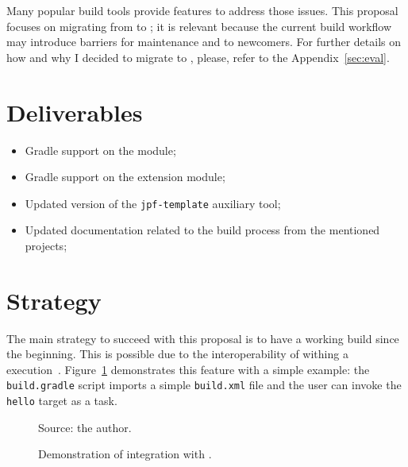 \documentclass{article}
\begin{document}
Many popular build tools provide features to address those issues.
This proposal focuses on migrating from \ant{} to \gradle{}; it is relevant
because the current build workflow may introduce barriers for maintenance and
to newcomers.
For further details on how and why I decided to migrate to \gradle{}, please,
refer to the Appendix~\ref{sec:eval}.

\section{Deliverables}
\label{sec:deliv}

\begin{itemize}
\item Gradle support on the \jpfcore{} module;
\item Gradle support on the \jpfsymbc{} extension module;
\item Updated version of the \texttt{jpf-template} auxiliary tool; 
\item Updated documentation related to the build process from the mentioned
projects;
\end{itemize}

\section{Strategy}
\label{sec:plan}

The main strategy to succeed with this proposal is to have a working \gradle{}
build since the beginning.
This is possible due to the interoperability of \ant{} withing a \gradle{}
execution~\cite{page:gradle-ant-support}.
Figure~\ref{fig:gradle-ant-support} demonstrates this feature with a simple
example: the \texttt{build.gradle} script imports a simple \texttt{build.xml}
file and the user can invoke the \texttt{hello} target as a \gradle{} task.

\begin{figure}[h!]
    \centering
    \begin{subfigure}[b]{0.4\textwidth}
        
    \end{subfigure}
    \hfill
    \begin{subfigure}[b]{0.4\textwidth}
        
    \end{subfigure}
    \hfill
    \begin{subfigure}[b]{0.4\textwidth}
        
    \end{subfigure}
    \caption{Demonstration of \ant{} integration with
    \gradle{}.\label{fig:gradle-ant-support}}
    {\scriptsize Source: the author.}
\end{figure}
\end{document}
